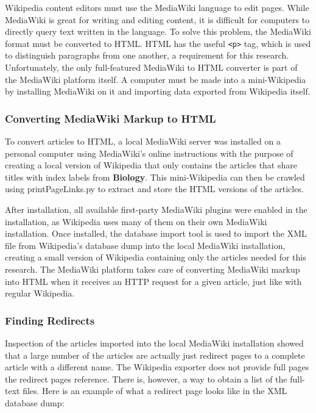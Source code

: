 Wikipedia content editors must use the MediaWiki language to edit pages. 
While MediaWiki is great for writing and editing content, it is difficult for computers to directly query text written in the language.
To solve this problem, the MediaWiki format must be converted to HTML.
HTML has the useful {\tt <p>} tag, which is used to distinguish paragraphs from one another, a requirement for this research. 
Unfortunately, the only full-featured MediaWiki to HTML converter is part of the MediaWiki platform itself.
A computer must be made into a mini-Wikipedia by installing MediaWiki on it and importing data exported from Wikipedia itself.

\subsubsection{Converting MediaWiki Markup to HTML}

To convert articles to HTML, a local MediaWiki server was installed on a personal computer using MediaWiki's online instructions \cite{mediawiki-installation} with the purpose of creating a local version of Wikipedia that only contains the articles that share titles with index labels from {\bf Biology}.
This mini-Wikipedia can then be crawled using printPageLinks.py to extract and store the HTML versions of the articles.

After installation, all available first-party MediaWiki plugins were enabled in the installation, as Wikipedia uses many of them on their own MediaWiki installation.
Once installed, the database import tool \cite{mediawiki-import} is used to import the XML file from Wikipedia's database dump into the local MediaWiki installation, creating a small version of Wikipedia containing only the articles needed for this research.
The MediaWiki platform takes care of converting MediaWiki markup into HTML when it receives an HTTP request for a given article, just like with regular Wikipedia.

\subsubsection{Finding Redirects}

Inspection of the articles imported into the local MediaWiki installation showed that a large number of the articles are actually just redirect pages to a complete article with a different name.
The Wikipedia exporter does not provide full pages the redirect pages reference.
There is, however, a way to obtain a list of the full-text files.
Here is an example of what a redirect page looks like in the XML database dump:

